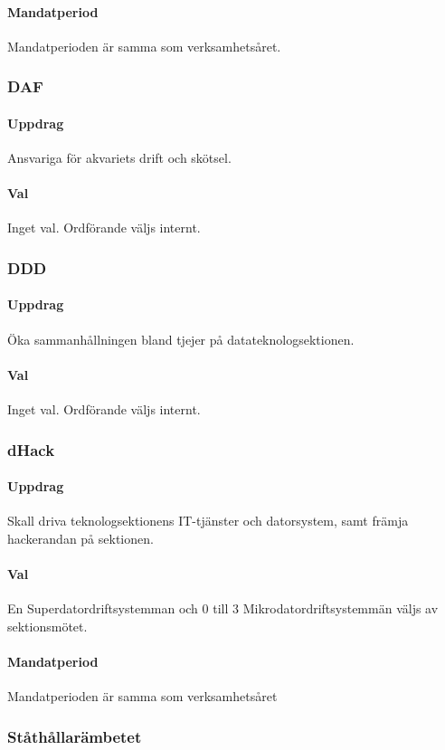 \paragraph{Mandatperiod}
Mandatperioden är samma som verksamhetsåret. 
\subsubsection{DAF}
\paragraph{Uppdrag}
Ansvariga för akvariets drift och skötsel. 
\paragraph{Val}
Inget val. Ordförande väljs internt. 
\subsubsection{DDD}
\paragraph{Uppdrag}
Öka sammanhållningen bland tjejer på datateknologsektionen. 
\paragraph{Val}
Inget val. Ordförande väljs internt.
\subsubsection{dHack}
\paragraph{Uppdrag}
Skall driva teknologsektionens IT-tjänster och datorsystem, samt
främja hackerandan på sektionen.
\paragraph{Val}
En Superdatordriftsystemman och 0 till 3 Mikrodatordriftsystemmän väljs av sektionsmötet.
\paragraph{Mandatperiod}
Mandatperioden är samma som verksamhetsåret
\subsubsection{Ståthållarämbetet}
